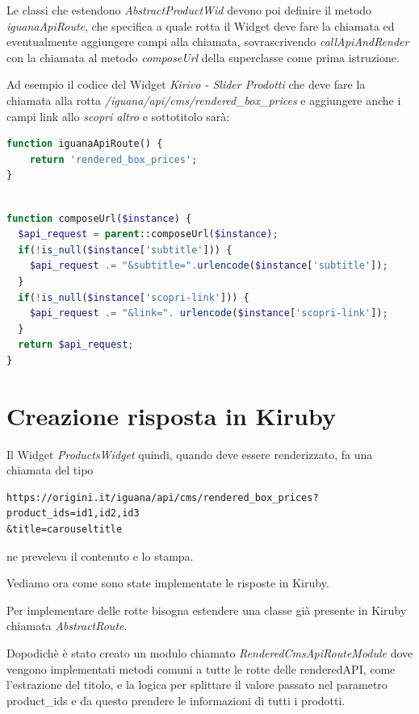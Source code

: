 Le classi che estendono \emph{AbstractProductWid} devono poi definire il metodo \emph{iguanaApiRoute}, che specifica
a quale rotta il Widget deve fare la chiamata ed eventualmente aggiungere campi alla chiamata, sovrascrivendo \emph{callApiAndRender} con la 
chiamata al metodo \emph{composeUrl} della superclasse come prima istruzione.

Ad esempio il codice del Widget \emph{Kirivo - Slider Prodotti} che deve fare la chiamata alla rotta \emph{/iguana/api/cms/rendered\_box\_prices} e aggiungere  anche i campi link allo \emph{scopri altro} e sottotitolo sarà:

\begin{lstlisting}[style=customphp, language=Php,caption={Viene sovrascritto \emph{iguanaApiRoute} da \emph{ProductsWidget} per specificare la chiamata da effettuare}] 
function iguanaApiRoute() {
    return 'rendered_box_prices';
}
\end{lstlisting}

\begin{lstlisting}[style=customphp, language=Php,caption={Ridefinendo \emph{composeUrl} vengono aggiunti ulteriori campi specifici del Widget \emph{ProductsWidget}}] 

function composeUrl($instance) {
  $api_request = parent::composeUrl($instance);
  if(!is_null($instance['subtitle'])) {
    $api_request .= "&subtitle=".urlencode($instance['subtitle']);
  }
  if(!is_null($instance['scopri-link'])) {
    $api_request .= "&link=". urlencode($instance['scopri-link']);
  }
  return $api_request;
}
\end{lstlisting}

\section{Creazione risposta in Kiruby}

Il Widget \emph{ProductsWidget} quindi, quando deve essere renderizzato, fa una chiamata del tipo
\begin{verbatim}
https://origini.it/iguana/api/cms/rendered_box_prices?product_ids=id1,id2,id3
&title=carouseltitle
\end{verbatim}
ne preveleva il contenuto e lo stampa.

Vediamo ora come sono state implementate le risposte in Kiruby.

Per implementare delle rotte bisogna estendere una classe già presente in Kiruby chiamata \emph{AbstractRoute}.

Dopodichè è stato creato un modulo chiamato \emph{RenderedCmsApiRouteModule} dove vengono implementati metodi comuni
a tutte le rotte delle renderedAPI, come l'estrazione del titolo, e la logica per splittare il valore passato nel
parametro product\_ids e da questo prendere le informazioni di tutti i prodotti.

